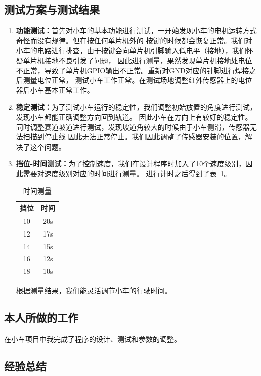 \documentclass[a4paper,twoside,zihao=5,UTF8]{ctexart}
\begin{document}
\begin{spacing}{1.2}
\subsection{测试方案与测试结果}

\begin{enumerate}
	\item \textbf{功能测试：}首先对小车的基本功能进行测试，一开始发现小车的电机运转方式奇怪而没有规律。但在按任何单片机外的
	按键的时候都会恢复正常。我们对小车的电路进行排查，由于按键会向单片机引脚输入低电平（接地），我们怀疑单片机接地不良引发了问题，
	因此进行测量，果然发现单片机接地处电位不正常，导致了单片机GPIO输出不正常。重新对GND对应的针脚进行焊接之后测量电位正常，
	测试小车工作正常。在测试场地调整红外传感器上的电位器后小车基本正常工作。

	\item \textbf{稳定测试：}为了测试小车运行的稳定性，我们调整初始放置的角度进行测试，发现小车都能正确调整方向回到轨道。
	因此小车在方向上有较好的稳定性。同时调整赛道坡道进行测试，发现坡道角较大的时候由于小车侧滑，传感器无法扫描到停止线
	因此无法正常停止。我们因此调整了传感器安装的位置，解决了这个问题。

	\item \textbf{挡位-时间测试：}为了控制速度，我们在设计程序时加入了10个速度级别，因此需要对速度级别对应的时间进行测量。
	进行计时之后得到了表~\ref{tbl:time}。
	\begin{table}[H]
		\centering
		\renewcommand\arraystretch{1.5}
		\caption{时间测量}
		\label{tbl:time}
		\begin{tabular}{c|c}
			\toprule
			\hline
			挡位 & 时间 \\
			\hline
			10 & 20s \\
			12 & 17s \\
			14 & 15s \\
			16 & 12s \\
			18 & 10s \\
			\hline
			\bottomrule
		\end{tabular}
	\end{table}
	根据测量结果，我们能灵活调节小车的行驶时间。
\end{enumerate}

\subsection{本人所做的工作}

在小车项目中我完成了程序的设计、测试和参数的调整。

\subsection{经验总结}


\end{spacing}
\end{document}
